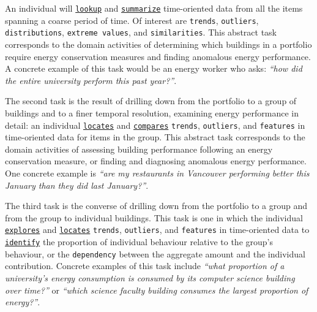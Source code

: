 \documentclass[journal]{vgtc}                %
\newcommand{\bstart}[1]{\vspace{1mm} \noindent{\textbf{#1:}}}
\begin{document}
\bstart{T1 / Overview} An individual will \underline{{\tt lookup}} and \underline{{\tt summarize}} time-oriented data from all the items spanning a coarse period of time. 
Of interest are {\tt trends}, {\tt outliers}, {\tt distributions}, {\tt extreme values}, and {\tt similarities}. 
This abstract task corresponds to the domain activities of determining which buildings in a portfolio require energy conservation measures and finding anomalous energy performance. 
A concrete example of this task would be an energy worker who asks: {\it ``how did the entire university perform this past year?''}.

\bstart{T2 / Drill Down} The second task is the result of drilling down from the portfolio to a group of buildings and to a finer temporal resolution, examining energy performance in detail: an individual \underline{{\tt locates}} and \underline{{\tt compares}} {\tt trends}, {\tt outliers}, and {\tt features} in time-oriented data for items in the group.
This abstract task corresponds to the domain activities of assessing building performance following an energy conservation measure, or finding and diagnosing anomalous energy performance. 
One concrete example is {\it ``are my restaurants in Vancouver performing better this January than they did last January?''}.

\bstart{T3 / Roll Up} The third task is the converse of drilling down from the portfolio to a group and from the group to individual buildings.
This task is one in which the individual \underline{{\tt explores}} and \underline{{\tt locates}} {\tt trends}, {\tt outliers}, and {\tt features} in time-oriented data to \underline{{\tt identify}} the proportion of individual behaviour relative to the group's behaviour, or the {\tt dependency} between the aggregate amount and the individual contribution.
Concrete examples of this task include {\it ``what proportion of a university's energy consumption is consumed by its computer science building over time?''} or {\it ``which science faculty building consumes the largest proportion of energy?''}.
\end{document}
